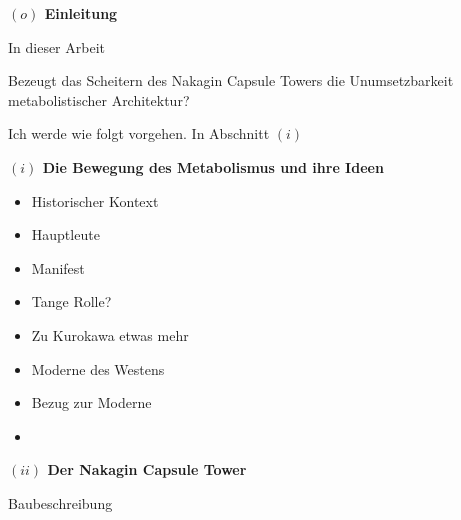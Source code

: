 \documentclass[a4paper, 12pt]{article}
\begin{document}
\begin{onehalfspace} 

\noindent\textbf{$(o)$ Einleitung}

\noindent In dieser Arbeit 

Bezeugt das Scheitern des Nakagin Capsule Towers die Unumsetzbarkeit metabolistischer Architektur?

\vspace{3mm}

Ich werde wie folgt vorgehen. In Abschnitt $(i)$ 

\vspace{5mm}
\noindent\textbf{$(i)$ Die Bewegung des Metabolismus und ihre Ideen} %



\begin{itemize}
  \item Historischer Kontext
  \item Hauptleute
  \item Manifest
  \item Tange Rolle?
  \item Zu Kurokawa etwas mehr
  \item Moderne des Westens
  \item Bezug zur Moderne
  \item  
\end{itemize}



\vspace{5mm}
\noindent\textbf{$(ii)$ Der Nakagin Capsule Tower}


Baubeschreibung


\end{onehalfspace}
\end{document}
